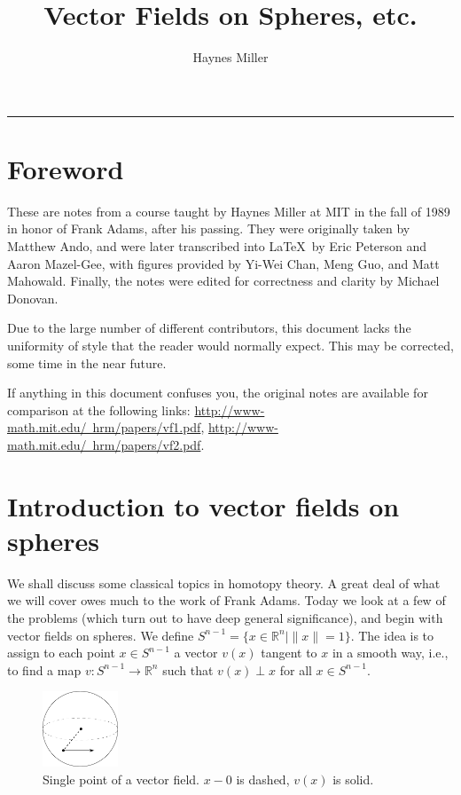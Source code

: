 \documentclass{article}
\title{Vector Fields on Spheres, etc.}
\author{Haynes Miller}
\providecommand{\OutputFrontMatter}{}
\providecommand{\OutputForeword}{0}
\providecommand{\OutputIntroductionToVectorFieldsOnSpheres}{1}
\newcommand{\R}{\mathbb{R}}
\renewcommand{\to}{\longrightarrow}
\theoremstyle{definition}
\begin{document}

\ifx\OutputFrontMatter\undefined\hrule\else
\maketitle
\tableofcontents
\fi

\section{Foreword} %
\label{Foreword}
\ifx\OutputForeword\undefined\else
These are notes from a course taught by Haynes Miller at MIT in the fall of 1989 in honor of Frank Adams, after his passing.  They were originally taken by Matthew Ando, and were later transcribed into \LaTeX\ by Eric Peterson and Aaron Mazel-Gee, with figures provided by Yi-Wei Chan, Meng Guo, and Matt Mahowald. Finally, the notes were edited for correctness and clarity by Michael Donovan.

Due to the large number of different contributors, this document lacks the uniformity of style that the reader would normally expect. This may be corrected, some time in the near future.

If anything in this document confuses you, the original notes are available for comparison at the following links: \href{http://www-math.mit.edu/~hrm/papers/vf1.pdf}{http://www-math.mit.edu/\string~hrm/papers/vf1.pdf}, \href{http://www-math.mit.edu/~hrm/papers/vf2.pdf}{http://www-math.mit.edu/\string~hrm/papers/vf2.pdf}.

\fi
\section{Introduction to vector fields on spheres} %
\label{IntroductionToVectorFieldsOnSpheres}
\ifx\OutputIntroductionToVectorFieldsOnSpheres\undefined\else

We shall discuss some classical topics in homotopy theory.  A great deal of what we will cover owes much to the work of Frank Adams.  Today we look at a few of the problems (which turn out to have deep general significance), and begin with vector fields on spheres.  We define $S^{n-1} = \{x \in \R^n \mid \|x\| = 1\}$.  The idea is to assign to each point $x \in S^{n-1}$ a vector $v(x)$ tangent to $x$ in a smooth way, i.e., to find a map $v: S^{n-1} \to \R^n$ such that $v(x) \perp x$ for all $x \in S^{n-1}$.

\begin{figure}
\centering\includegraphics[width=0.2\textwidth]{figures/fig1.pdf}
\caption{\small Single point of a vector field. $x - 0$ is dashed, $v(x)$ is solid.}
\end{figure}
\end{document}
